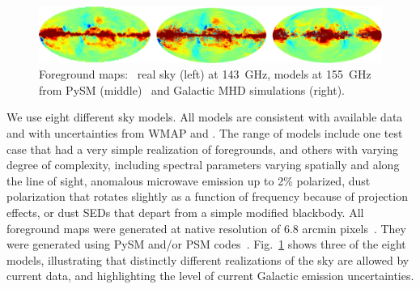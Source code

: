 \documentclass[PICOReport.tex]{subfiles}
\begin{document}
\begin{figure}[t]
\begin{center}
\includegraphics[width=.95\textwidth]{images/foregrounds_maps_planck_models}
\vspace{-0.1in}
\caption{\captiontext
Foreground maps: \planck~real sky (left) at 143~GHz, models at 155~GHz from PySM (middle)~\citep{thorne2018_pysm} and Galactic MHD simulations (right). }
\label{fig:pysm_foregrounds}
\end{center}
\vspace{-0.2in}
\end{figure}

We use eight different sky models. All models are consistent with available data and with uncertainties from WMAP and \planck . The range of models include one test case that had a very simple realization of foregrounds, and others with varying degree of complexity, including spectral parameters varying spatially and along the line of sight, anomalous microwave emission up to 2\% polarized, dust polarization that rotates slightly as a function of frequency because of projection effects, or dust \ac{SED}s that depart from a simple modified blackbody. All foreground maps were generated at native resolution of 6.8 arcmin pixels~\citep{gorski/etal:2005}. They were generated using PySM and/or PSM codes~\citep{thorne2018_pysm,delabrouille/etal:2013}. Fig.~\ref{fig:pysm_foregrounds} shows three of the eight models, illustrating that distinctly different realizations of the sky are allowed by current data, and highlighting the level of current Galactic emission uncertainties. 
\end{document}
